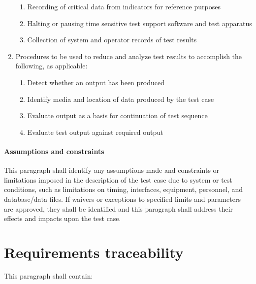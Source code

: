 \documentclass{fidata-report-template}
\begin{document}
\begin{enumerate}
  \begin{enumerate}
  \itemsep1pt\parskip0pt
  \item
    Recording of critical data from indicators for reference purposes
  \item
    Halting or pausing time sensitive test support software and test
    apparatus
  \item
    Collection of system and operator records of test results
  \end{enumerate}
\item
  Procedures to be used to reduce and analyze test results to accomplish
  the following, as applicable:

  \begin{enumerate}
  \itemsep1pt\parskip0pt
  \item
    Detect whether an output has been produced
  \item
    Identify media and location of data produced by the test case
  \item
    Evaluate output as a basis for continuation of test sequence
  \item
    Evaluate test output against required output
  \end{enumerate}
\end{enumerate}

\paragraph{Assumptions and constraints}

This paragraph shall identify any assumptions made and constraints or
limitations imposed in the description of the test case due to system or
test conditions, such as limitations on timing, interfaces, equipment,
personnel, and database/data files. If waivers or exceptions to
specified limits and parameters are approved, they shall be identified
and this paragraph shall address their effects and impacts upon the test
case.

\section{Requirements traceability}

This paragraph shall contain:
\end{document}
